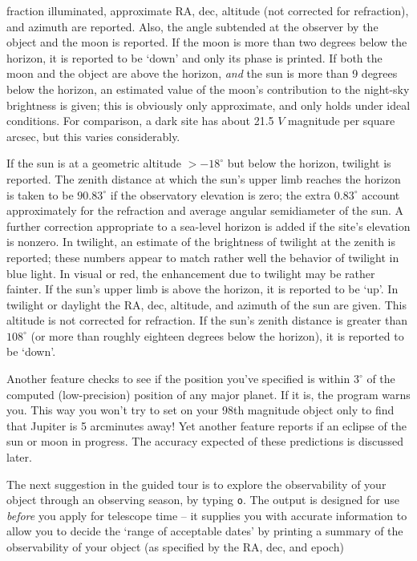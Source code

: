 fraction illuminated, approximate RA, dec, altitude (not corrected
for refraction), and azimuth are 
reported.  Also, the angle subtended at the observer by the object 
and the moon is reported.  If the moon is more than two degrees below
the horizon, it is reported to be `down' and only its phase is
printed.  If both the moon and the object are above the horizon, 
{\it and} the sun is more than 9 degrees below the horizon, an
estimated value of the moon's contribution to the night-sky brightness
is given; this is obviously only approximate, and only holds under
ideal conditions.  For comparison, a dark site has about 21.5
$V$ magnitude per square arcsec, but this varies considerably.
\par
If the sun is at a geometric altitude $> -18^{\circ}$ but below the
horizon, twilight is reported.  The zenith distance at which the
sun's upper limb reaches the horizon is taken to be $90.83^{\circ}$
if the observatory elevation is zero; the extra $0.83^{\circ}$
account approximately for the refraction and average angular 
semidiameter of the sun.  A further correction appropriate
to a sea-level horizon is added if the site's elevation is nonzero.
In twilight, an estimate of the brightness of twilight at the 
zenith is reported; these numbers appear to match rather well
the behavior of twilight in blue light.  In visual or red, the 
enhancement due to twilight may be rather fainter.
If the sun's upper limb is above the horizon, 
it is reported to be `up'.  In twilight or daylight 
the RA, dec, altitude, and azimuth of the sun are given.
This altitude is not corrected for refraction.  If the sun's zenith distance
is greater than $108^{\circ}$ (or more than roughly
eighteen degrees below the horizon), it is reported to be `down'.
\par
Another feature checks to see if the position you've specified
is within $3^{\circ}$ of the computed (low-precision) position 
of any major planet.  If it is, the program warns you.  This way
you won't try to set on your 98th magnitude object only to find that Jupiter
is 5 arcminutes away!
Yet another feature reports if an eclipse of the
sun or moon in progress.  The accuracy expected of these predictions
is discussed later.


The next suggestion in the guided tour is to explore the
observability of your object through an observing season,
by typing {\tt o}.  
The output is designed for use {\it before} you apply for telescope time --
it supplies you with accurate information to allow you to decide the
`range of acceptable dates' by printing a summary of the observability
of your object (as specified by the RA, dec, and epoch)

